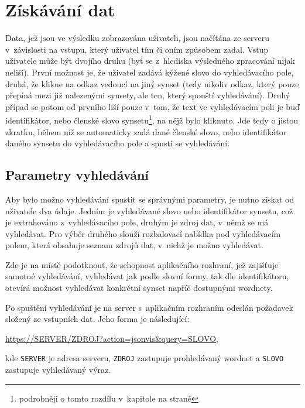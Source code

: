 \documentclass[a4paper,11pt,openany,twoside]{book}
\newcommand{\itNameRef}[1]{\textit{\nameref{#1}}}
\begin{document}
			\section{Získávání dat}
				
				Data, jež jsou ve výsledku zobrazována uživateli, jsou načítána ze serveru v~závislosti na vstupu, který uživatel tím či oním způsobem zadal. Vstup uživatele může být dvojího druhu (byť se z~hlediska výsledného zpracování nijak neliší). První možnost je, že uživatel zadává kýžené slovo do vyhledávacího pole, druhá, že klikne na odkaz vedoucí na jiný synset (tedy nikoliv odkaz, který pouze přepíná mezi již nalezenými synsety, ale ten, který spouští vyhledávání). Druhý případ se potom od prvního liší pouze v~tom, že text ve vyhledávacím poli je buď identifikátor, nebo členské slovo synsetu\footnote{podrobněji o tomto rozdílu v~kapitole \itNameRef{cha:textovarepres} na straně \pageref{cha:textovarepres}}, na nějž bylo kliknuto. Jde tedy o jistou zkratku, během níž se automaticky zadá dané členské slovo, nebo identifikátor daného synsetu do vyhledávacího pole a spustí se vyhledávání.

				\subsection{Parametry vyhledávání}
				
					Aby bylo možno vyhledávání spustit se správnými parametry, je nutno získat od uživatele dva údaje. Jedním je vyhledávané slovo nebo identifikátor synsetu, což je extrahováno z~vyhledávacího pole, druhým je zdroj dat, v~němž se má vyhledávat. Pro výběr druhého slouží rozbalovací nabídka pod vyhledávacím polem, která obsahuje seznam zdrojů dat, v~nichž je možno vyhledávat.

					Zde je na místě podotknout, že schopnost aplikačního rozhraní, jež zajišťuje samotné vyhledávání, vyhledávat jak podle slovní formy, tak dle identifikátoru, otevírá možnost vyhledávat konkrétní synset napříč dostupnými wordnety. 

					Po spuštění vyhledávání je na server s~aplikačním rozhraním odeslán požadavek složený ze vstupních dat. Jeho forma je následující:

					\medskip
					\url{https://SERVER/ZDROJ?action=jsonvis&query=SLOVO}\hspace{1em},
					\medskip

					kde \texttt{SERVER} je adresa serveru, \texttt{ZDROJ} zastupuje prohledávaný wordnet a \texttt{SLOVO} zastupuje vyhledávaný výraz.
\end{document}
